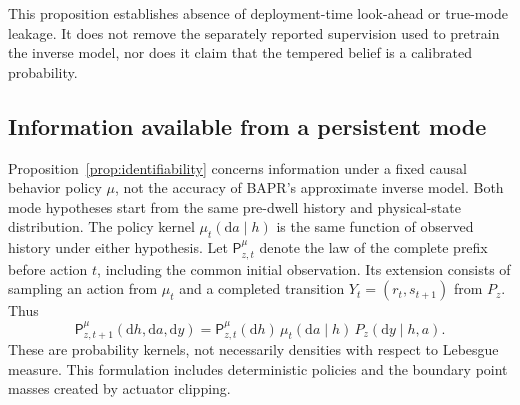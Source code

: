 This proposition establishes absence of deployment-time look-ahead or true-mode leakage. It does not remove the separately reported supervision used to pretrain the inverse model, nor does it claim that the tempered belief is a calibrated probability.

\subsection{Information available from a persistent mode}

Proposition~\ref{prop:identifiability} concerns information under a fixed causal behavior policy $\mu$, not the accuracy of BAPR's approximate inverse model. Both mode hypotheses start from the same pre-dwell history and physical-state distribution. The policy kernel $\mu_t(\mathrm da\mid h)$ is the same function of observed history under either hypothesis. Let $\mathsf P_{z,t}^{\mu}$ denote the law of the complete prefix before action $t$, including the common initial observation. Its extension consists of sampling an action from $\mu_t$ and a completed transition $Y_t=(r_t,s_{t+1})$ from $P_z$. Thus
\begin{equation}
 \mathsf P_{z,t+1}^{\mu}(\mathrm dh,\mathrm da,\mathrm dy)
 =\mathsf P_{z,t}^{\mu}(\mathrm dh)\,
 \mu_t(\mathrm da\mid h)\,P_z(\mathrm dy\mid h,a).
\end{equation}
These are probability kernels, not necessarily densities with respect to Lebesgue measure. This formulation includes deterministic policies and the boundary point masses created by actuator clipping.

